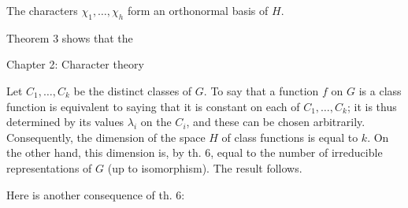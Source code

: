 The characters $\chi_1, \ldots, \chi_h$ form an orthonormal basis of $H$.

Theorem 3 shows that the

Chapter 2: Character theory

Let $C_1, \ldots, C_k$ be the distinct classes of $G$. To say that a function $f$ on $G$ is a class function is equivalent to saying that it is constant on each of $C_1, \ldots, C_k$; it is thus determined by its values $\lambda_i$ on the $C_i$, and these can be chosen arbitrarily. Consequently, the dimension of the space $H$ of class functions is equal to $k$. On the other hand, this dimension is, by th. 6, equal to the number of irreducible representations of $G$ (up to isomorphism). The result follows.

Here is another consequence of th. 6:
